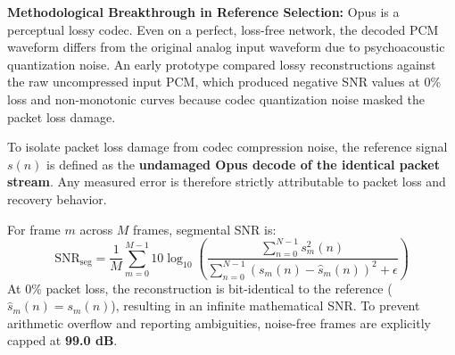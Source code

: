 \textbf{Methodological Breakthrough in Reference Selection:} 
Opus is a perceptual lossy codec. Even on a perfect, loss-free network, the decoded PCM waveform differs from the original analog input waveform due to psychoacoustic quantization noise. An early prototype compared lossy reconstructions against the raw uncompressed input PCM, which produced negative SNR values at 0\% loss and non-monotonic curves because codec quantization noise masked the packet loss damage.

To isolate packet loss damage from codec compression noise, the reference signal $s(n)$ is defined as the \textbf{undamaged Opus decode of the identical packet stream}. Any measured error is therefore strictly attributable to packet loss and recovery behavior.

For frame $m$ across $M$ frames, segmental SNR is:
\begin{equation}
    \text{SNR}_{\text{seg}} = \frac{1}{M} \sum_{m=0}^{M-1} 10 \log_{10} \left( \frac{\sum_{n=0}^{N-1} s_m^2(n)}{\sum_{n=0}^{N-1} (s_m(n) - \hat{s}_m(n))^2 + \epsilon} \right)
\end{equation}
At 0\% packet loss, the reconstruction is bit-identical to the reference ($\hat{s}_m(n) = s_m(n)$), resulting in an infinite mathematical SNR. To prevent arithmetic overflow and reporting ambiguities, noise-free frames are explicitly capped at \textbf{99.0 dB}.
